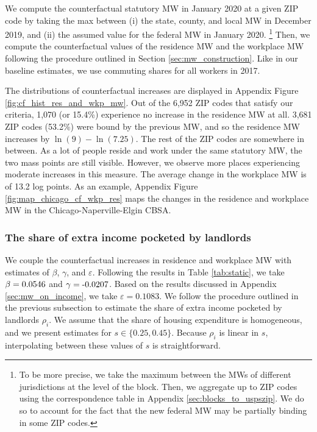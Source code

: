 We compute the counterfactual statutory MW in January 2020 at a given ZIP code 
by taking the max between (i) the state, county, and local MW in December 2019, 
and (ii) the assumed value for the federal MW in January 2020.%
\footnote{To be more precise, we take the maximum between the MWs of different
jurisdictions at the level of the block.
Then, we aggregate up to ZIP codes using the correspondence table in Appendix 
\ref{sec:blocks_to_uspszip}.
We do so to account for the fact that the new federal MW may be partially binding
in some ZIP codes.}
Then, we compute the counterfactual values of the residence MW and the workplace
MW following the procedure outlined in Section \ref{sec:mw_construction}.
Like in our baseline estimates, we use commuting shares for all workers in
2017.

The distributions of counterfactual increases are displayed in Appendix
Figure \ref{fig:cf_hist_res_and_wkp_mw}.
Out of the 6,952 ZIP codes that satisfy our criteria, 1,070 (or 15.4\%) 
experience no increase in the residence MW at all.
3,681 ZIP codes (53.2\%) were bound by the previous MW, and so the residence MW
increases by $\ln(9)-\ln(7.25)$.
The rest of the ZIP codes are somewhere in between.
As a lot of people reside and work under the same statutory MW, the two mass
points are still visible.
However, we observe more places experiencing moderate increases in this measure.
The average change in the workplace MW is of 13.2 log points.
As an example, Appendix Figure \ref{fig:map_chicago_cf_wkp_res} maps the changes 
in the residence and workplace MW in the Chicago-Naperville-Elgin CBSA.

\subsubsection*{The share of extra income pocketed by landlords}
\label{sec:cf_rents_and_wage_changes}

We couple the counterfactual increases in residence and workplace MW with 
estimates of $\beta$, $\gamma$, and $\varepsilon$.
Following the results in Table \ref{tab:static}, we take 
$\beta = \textnormal{0.0546}$ and 
$\gamma = \textnormal{-0.0207}$.
Based on the results discussed in Appendix \ref{sec:mw_on_income}, we take
$\varepsilon = 0.1083$.
We follow the procedure outlined in the previous subsection to estimate the 
share of extra income pocketed by landlords $\rho_i$.
We assume that the share of housing expenditure is homogeneous, and 
we present estimates for $s\in\{0.25, 0.45\}$.
Because $\rho_i$ is linear in $s$, interpolating between these values of 
$s$ is straightforward.

